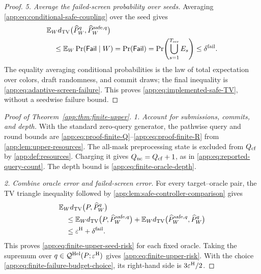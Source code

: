 \begin{proof}
\emph{5. Average the failed-screen probability over seeds.}
Averaging \eqref{app:eq:conditional-safe-coupling} over the seed gives
\begin{align*}
 &\mathbb E_Wd_{\mathrm{TV}}\bigl(\widehat P_{W}^{q},
                        \widehat P_{W}^{\mathrm{safe},q}\bigr)\\
 &\quad\le\mathbb E_W\Pr(\mathsf{Fail}\mid W)
 =\Pr(\mathsf{Fail})
 =\Pr\!\left(\bigcup_{s=1}^{T_{\mathrm{scr}}}E_s\right)
 \le\delta^{\mathrm{fail}}.
\end{align*}
The equality averaging conditional probabilities is the law of total
expectation over colors, draft randomness, and commit draws; the final
inequality is \eqref{app:eq:adaptive-screen-failure}.  This proves
\eqref{app:eq:implemented-safe-TV}, without a seedwise failure bound.
\end{proof}

\begin{proof}[Proof of Theorem~\ref{app:thm:finite-upper}]

\emph{1. Account for submissions, commits, and depth.}
With the standard zero-query generator, the pathwise query and round bounds are
\eqref{app:eq:proof-finite-Q}--\eqref{app:eq:proof-finite-R} from
\cref{app:lem:upper-resources}.  The all-mask preprocessing state is excluded
from $Q_{\mathrm{cf}}$ by
\textcolor{red}{\cref{app:def:resources}}. Charging it gives
$Q_{\mathrm{nc}}=Q_{\mathrm{cf}}+1$, as in
\eqref{app:eq:reported-query-count}.
The depth bound is \eqref{app:eq:finite-oracle-depth}.


\emph{2. Combine oracle error and failed-screen error.}
For every target--oracle pair, the TV triangle inequality followed by
\cref{app:lem:safe-controller-comparison} gives
\begin{align}
 &\mathbb E_{W}
 d_{\mathrm{TV}}\bigl(
  P,
  \widehat P_{W}^{q}
 \bigr)\notag\\
 &\quad\le
 \mathbb E_{W}
 d_{\mathrm{TV}}\bigl(
  P,
  \widehat P_{W}^{\mathrm{safe},q}
 \bigr)
 +\mathbb E_{W}
 d_{\mathrm{TV}}\bigl(
  \widehat P_{W}^{\mathrm{safe},q},
  \widehat P_{W}^{q}
 \bigr)\notag\\
 &\quad\le
 \varepsilon^{\mathrm H}+\delta^{\mathrm{fail}}.
 \label{app:eq:randomized-upper-TV-proof}
\end{align}
This proves \eqref{app:eq:finite-upper-seed-risk} for each fixed oracle.
Taking the supremum over
$q\in\mathcal Q^{\mathrm{Hel}}(P;\varepsilon^{\mathrm H})$ gives
\eqref{app:eq:finite-upper-risk}.  With the choice
\eqref{app:eq:finite-failure-budget-choice}, its
right-hand side is $3\varepsilon^{\mathrm H}/2$.
\end{proof}

